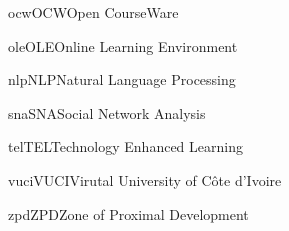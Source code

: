

\newacronym
{ocw}{OCW}{Open CourseWare}

\newacronym
{ole}{OLE}{Online Learning Environment}

\newacronym
{nlp}{NLP}{Natural Language Processing}

\newacronym
{sna}{SNA}{Social Network Analysis}

\newacronym
{tel}{TEL}{Technology Enhanced Learning}

\newacronym
{vuci}{VUCI}{Virutal University of Côte d'Ivoire}

\newacronym
{zpd}{ZPD}{Zone of Proximal Development}

